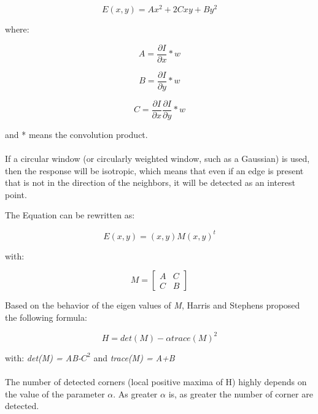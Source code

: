 \documentclass{article}
\begin{document}
	\begin{equation}
	E(x,y) = Ax^2 + 2Cxy + By^2
	\end{equation}
	
	where:
	
	\begin{equation}
	A = \frac{\partial I}{\partial x} * w
	\end{equation}

	\begin{equation}
	B = \frac{\partial I}{\partial y} * w
	\end{equation}

	\begin{equation}
	C = \frac{\partial I}{\partial x} \frac{\partial I}{\partial y} * w
	\end{equation}

	and  * means the convolution product.
	\\\\
	If a circular window (or circularly weighted window, such as a Gaussian) is used, then the response will be isotropic, which means that even if an edge is present that is not in the direction of the neighbors, it will be detected as an interest point.

	The Equation can be rewritten as:

	\begin{equation}
	E(x,y) = (x,y)M(x,y)^t
	\end{equation}
	
	with:

	\begin{equation}
	M = 	\begin{bmatrix}
		A&C\\
		C&B
		\end{bmatrix}
	\end{equation}

	Based on the behavior of the eigen values of \textit{M}, Harris and Stephens proposed the following formula:

	\begin{equation}
	H = det(M) - \alpha trace(M)^2
	\end{equation}

	with: \textit{det(M) = AB-$C^2$} and \textit{trace(M) = A+B}
	\\\\
	The number of detected corners (local positive maxima of H) highly depends on the value of the parameter \textit{$\alpha$}. As greater \textit{$\alpha$} is, as greater the number of corner are detected.
	
\end{document}
